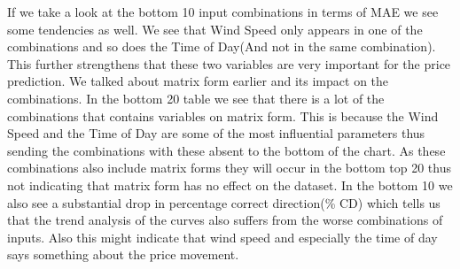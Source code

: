 If we take a look at the bottom 10 input combinations in terms of MAE we see some tendencies as well. We see that Wind Speed only appears in one of the combinations and so does the Time of Day(And not in the same combination). This further strengthens that these two variables are very important for the price prediction. We talked about matrix form earlier and its impact on the combinations. In the bottom 20 table we see that there is a lot of the combinations that contains variables on matrix form. This is because the Wind Speed and the Time of Day are some of the most influential parameters thus sending the combinations with these absent to the bottom of the chart. As these combinations also include matrix forms they will occur in the bottom top 20 thus not indicating that matrix form has no effect on the dataset. In the bottom 10 we also see a substantial drop in percentage correct direction(\% CD) which tells us that the trend analysis of the curves also suffers from the worse combinations of inputs. Also this might indicate that wind speed and especially the time of day says something about the price movement.


